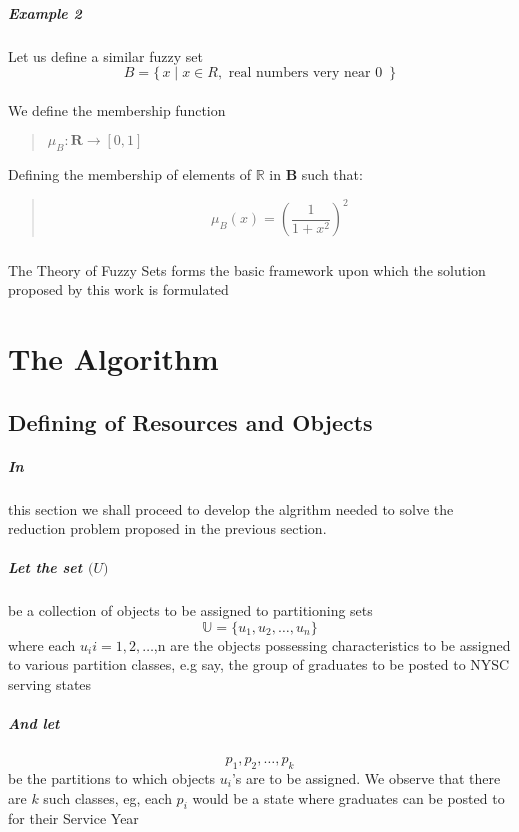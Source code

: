 \documentclass[a4paper,openany]{book}
\begin{document}
				\paragraph{Example 2}
					Let us define a similar fuzzy set 
					\[
					B = \{\, x \mid x \in R, \text{ real numbers very near 0 } \,\}
					\]
					\\We define the membership function
					\begin{verse}
						$\mu_B\colon \textbf{R} \to [0,1] $
					\end{verse}
					Defining the membership of elements of $\mathbb{R}$ in $\mathbf{B}$ such that:
					\begin{verse}
						\begin{equation}
							\mu_B(x) = \left( \frac{1}{1+x^2} \right)^{2}
						\end{equation}
					\end{verse}
				\paragraph{}
					The Theory of Fuzzy Sets forms the basic framework upon which the solution proposed by this work is formulated
	\chapter{The Algorithm}
		\section{Defining of Resources and Objects}
			\paragraph{In}
				this section we shall proceed to develop the algrithm needed to solve the reduction problem proposed in the previous section.
			\paragraph{Let the set $\mathbb(U)$} be a collection of objects to be assigned to partitioning sets
				\begin{equation}
					\mathbb{U} = \{u_1, u_2,\dots,u_n\}				
				\end{equation}
				where each $u_i i=1,2,\dots$,n are the objects possessing characteristics to be assigned to various partition classes, e.g say, the group of graduates to be posted to NYSC serving states
			\paragraph{And let}
			\begin{equation}
				p_1,p_2,\dots,p_k
			\end{equation}
				be the partitions to which objects $u_i$'s are to be assigned. We observe that there are $k$ such classes, eg, each $p_i$ would be a state where graduates can be posted to for their Service Year
\end{document}
